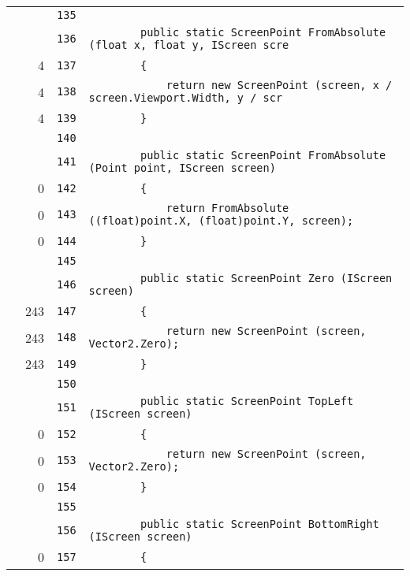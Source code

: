 \documentclass[a4paper,10pt]{article}
\begin{document}
\begin{longtable}[l]{lrrl}
\cellcolor{gray} &  & \verb~135~ & \verb~~\\
\cellcolor{gray} &  & \verb~136~ & \verb~        public static ScreenPoint FromAbsolute (float x, float y, IScreen scre~\\
\cellcolor{green} & 4 & \verb~137~ & \verb~        {~\\
\cellcolor{green} & 4 & \verb~138~ & \verb~            return new ScreenPoint (screen, x / screen.Viewport.Width, y / scr~\\
\cellcolor{green} & 4 & \verb~139~ & \verb~        }~\\
\cellcolor{gray} &  & \verb~140~ & \verb~~\\
\cellcolor{gray} &  & \verb~141~ & \verb~        public static ScreenPoint FromAbsolute (Point point, IScreen screen)~\\
\cellcolor{red} & 0 & \verb~142~ & \verb~        {~\\
\cellcolor{red} & 0 & \verb~143~ & \verb~            return FromAbsolute ((float)point.X, (float)point.Y, screen);~\\
\cellcolor{red} & 0 & \verb~144~ & \verb~        }~\\
\cellcolor{gray} &  & \verb~145~ & \verb~~\\
\cellcolor{gray} &  & \verb~146~ & \verb~        public static ScreenPoint Zero (IScreen screen)~\\
\cellcolor{green} & 243 & \verb~147~ & \verb~        {~\\
\cellcolor{green} & 243 & \verb~148~ & \verb~            return new ScreenPoint (screen, Vector2.Zero);~\\
\cellcolor{green} & 243 & \verb~149~ & \verb~        }~\\
\cellcolor{gray} &  & \verb~150~ & \verb~~\\
\cellcolor{gray} &  & \verb~151~ & \verb~        public static ScreenPoint TopLeft (IScreen screen)~\\
\cellcolor{red} & 0 & \verb~152~ & \verb~        {~\\
\cellcolor{red} & 0 & \verb~153~ & \verb~            return new ScreenPoint (screen, Vector2.Zero);~\\
\cellcolor{red} & 0 & \verb~154~ & \verb~        }~\\
\cellcolor{gray} &  & \verb~155~ & \verb~~\\
\cellcolor{gray} &  & \verb~156~ & \verb~        public static ScreenPoint BottomRight (IScreen screen)~\\
\cellcolor{red} & 0 & \verb~157~ & \verb~        {~\\

\end{longtable}
\end{document}

